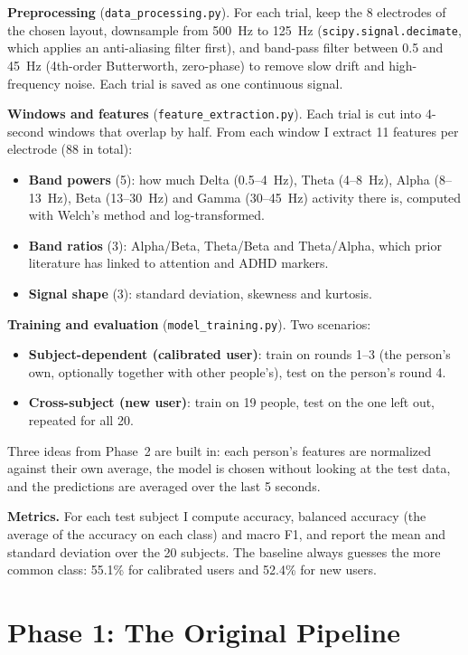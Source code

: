 \documentclass[12pt]{article}
\begin{document}
\textbf{Preprocessing} (\texttt{data\_processing.py}). For each trial, keep the 8 electrodes of the chosen layout, downsample from 500~Hz to 125~Hz (\texttt{scipy.signal.decimate}, which applies an anti-aliasing filter first), and band-pass filter between 0.5 and 45~Hz (4th-order Butterworth, zero-phase) to remove slow drift and high-frequency noise. Each trial is saved as one continuous signal.

\textbf{Windows and features} (\texttt{feature\_extraction.py}). Each trial is cut into 4-second windows that overlap by half. From each window I extract 11 features per electrode (88 in total):
\begin{itemize}
    \item \textbf{Band powers} (5): how much Delta (0.5--4~Hz), Theta (4--8~Hz), Alpha (8--13~Hz), Beta (13--30~Hz) and Gamma (30--45~Hz) activity there is, computed with Welch's method and log-transformed.
    \item \textbf{Band ratios} (3): Alpha/Beta, Theta/Beta and Theta/Alpha, which prior literature has linked to attention and ADHD markers.
    \item \textbf{Signal shape} (3): standard deviation, skewness and kurtosis.
\end{itemize}

\textbf{Training and evaluation} (\texttt{model\_training.py}). Two scenarios:
\begin{itemize}
    \item \textbf{Subject-dependent (calibrated user)}: train on rounds 1--3 (the person's own, optionally together with other people's), test on the person's round 4.
    \item \textbf{Cross-subject (new user)}: train on 19 people, test on the one left out, repeated for all 20.
\end{itemize}
Three ideas from Phase~2 are built in: each person's features are normalized against their own average, the model is chosen without looking at the test data, and the predictions are averaged over the last 5 seconds.

\textbf{Metrics.} For each test subject I compute accuracy, balanced accuracy (the average of the accuracy on each class) and macro F1, and report the mean and standard deviation over the 20 subjects. The baseline always guesses the more common class: 55.1\% for calibrated users and 52.4\% for new users.

\section{Phase 1: The Original Pipeline}
\end{document}
